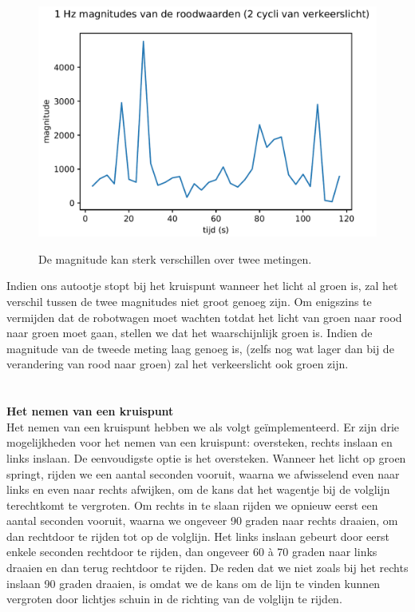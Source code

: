 \documentclass[a4paper,kulak]{kulakarticle}
\begin{document}
\begin{figure}[h]
	\centering
	\includegraphics[width=.8\textwidth] {magnitudes.PNG}
	\label{grafiek}
	\caption{De magnitude kan sterk verschillen over twee metingen.}
\end{figure}

Indien ons autootje stopt bij het kruispunt wanneer het licht al groen is, zal het verschil tussen de twee magnitudes niet groot genoeg zijn. Om enigszins te vermijden dat de robotwagen moet wachten totdat het licht van groen naar rood naar groen moet gaan, stellen we dat het waarschijnlijk groen is. Indien de magnitude van de tweede meting laag genoeg is, (zelfs nog wat lager dan bij de verandering van rood naar groen) zal het verkeerslicht ook groen zijn.\\ \\
\\
\textbf{\large Het nemen van een kruispunt} \
\\
Het nemen van een kruispunt hebben we als volgt geïmplementeerd. Er zijn drie mogelijkheden voor het nemen van een kruispunt: oversteken, rechts inslaan en links inslaan. De eenvoudigste optie is het oversteken. Wanneer het licht op groen springt, rijden we een aantal seconden vooruit, waarna we afwisselend even naar links en even naar rechts afwijken, om de kans dat het wagentje bij de volglijn terechtkomt te vergroten. Om rechts in te slaan rijden we opnieuw eerst een aantal seconden vooruit, waarna we ongeveer 90 graden naar rechts draaien, om dan rechtdoor te rijden tot op de volglijn. Het links inslaan gebeurt door eerst enkele seconden rechtdoor te rijden, dan ongeveer 60 à 70 graden naar links draaien en dan terug rechtdoor te rijden. De reden dat we niet zoals bij het rechts inslaan 90 graden draaien, is omdat we de kans om de lijn te vinden kunnen vergroten door lichtjes schuin in de richting van de volglijn te rijden.
\end{document}
